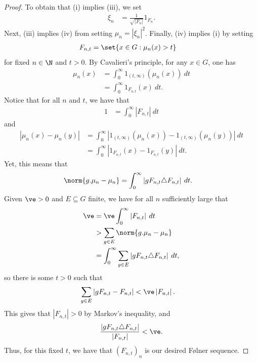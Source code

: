 \documentclass[10pt]{mypackage}
\begin{document}
\begin{proof}
  To obtain that (i) implies (iii), we set
  \begin{align*}
    \xi_n &= \frac{1}{\sqrt{\left\vert F_n \right\vert}} 1_{F_n}.
  \end{align*}
  Next, (iii) implies (iv) from setting $\mu_n = \left\vert \xi_n \right\vert^2$. Finally, (iv) implies (i) by setting
  \begin{align*}
    F_{n,t} &= \set{x\in G : \mu_n(x) > t}
  \end{align*}
  for fixed $n\in \N$ and $t > 0$. By Cavalieri's principle, for any $x\in G$, one has
  \begin{align*}
    \mu_n\left( x \right) &= \int_{0}^{\infty} 1_{(t,\infty)}\left( \mu_n(x) \right)\:dt\\
                          &= \int_{0}^{\infty} 1_{F_{n,t}}(x)\:dt.
  \end{align*}
  Notice that for all $n$ and $t$, we have that
  \begin{align*}
    1 &= \int_{0}^{\infty} \left\vert F_{n,t} \right\vert\:dt
  \end{align*}
  and
  \begin{align*}
    \left\vert \mu_n(x) - \mu_n(y) \right\vert &= \int_{0}^{\infty} \left\vert 1_{(t,\infty)}\left( \mu_n(x) \right) - 1_{(t,\infty)}\left( \mu_n(y) \right) \right\vert\:dt\\
                                               &= \int_{0}^{\infty} \left\vert 1_{F_{n,t}}(x) - 1_{F_{n,t}}(y) \right\vert\:dt.
  \end{align*}
  Yet, this means that
  \begin{align*}
    \norm{g.\mu_n- \mu_n} &= \int_{0}^{\infty} \left\vert gF_{n,t}\triangle F_{n,t} \right\vert\:dt.
  \end{align*}
  Given $\ve > 0$ and $E\subseteq G$ finite, we have for all $n$ sufficiently large that
  \begin{align*}
    \ve &= \ve \int_{0}^{\infty} \left\vert F_{n,t} \right\vert\:dt\\
        &> \sum_{g\in E} \norm{g.\mu_n-\mu_n}\\
        &= \int_{0}^{\infty} \sum_{g\in E}\left\vert gF_{n,t}\triangle F_{n,t} \right\vert\:dt,
  \end{align*}
  so there is some $t > 0$ such that
  \begin{align*}
    \sum_{g\in E} \left\vert gF_{n,t}-F_{n,t} \right\vert &< \ve\left\vert F_{n,t} \right\vert.
  \end{align*}
  This gives that $\left\vert F_{n,t} \right\vert > 0$ by Markov's inequality, and
  \begin{align*}
    \frac{\left\vert gF_{n,t}\triangle F_{n,t} \right\vert}{\left\vert F_{n,t} \right\vert} < \ve.
  \end{align*}
  Thus, for this fixed $t$, we have that $ \left( F_{n,t} \right)_{n} $ is our desired Følner sequence.


\end{proof}
\end{document}
